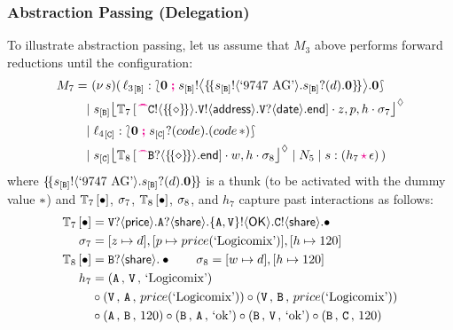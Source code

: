 \documentclass[runningheads,plain]{llncs}
\begin{document}
\subsubsection{Abstraction Passing (Delegation)}
To illustrate abstraction passing, let us assume that 
$M_3$ above performs forward reductions
until the configuration:
\begin{align*}
M_7 = ~ &   \news{s}(\,  \np{\key{{\loc_3}}{\pB}}{ \conf{\inact}{\bbout{\epB}{\thunkp{\bout{\epB}{\text{`9747 AG'}}\binp{\epB}{d}\inact}}\inact}} 
\\
& \!\!\!\! \Par \hmoni{\ep{s}{\pB}}{\myctxr{\ctx{T}_7}{\past \ltout{C}{\thunkt}{\ltout{\pS}{\mathsf{address}}{\ltinp{\pS}{\mathsf{date}}{\lend}}}}}{z,p,h}{\store_7} 
\\
& \!\!\!\! \Par \np{\key{{\loc_4}}{\pC}}{ \conf{\inact}{\binp{\epC}{code}(\appl{code}{\dummyn})}} 
\\
&  \!\!\!\! \Par 
\hmoni{\ep{s}{\pC}}{\myctxr{\ctx{T}_8}{\past \ltinp{B}{\thunkt}{\lend}}}{w,h}{\store_8} 
\Par N_5 \Par \codah{s}{h_7}{\emp}{}~) 
\end{align*}
where 
$\{\!\{s_{[\mathtt{B}]} ! \langle \text{`9747 AG'} \rangle .s_{[\mathtt{B}]} ? (d) .\mathbf{0}\}\!\}$
is a thunk (to be activated with the dummy value $\ast$) and 
${\mathbb{T}_7\left[\textcolor{black}{\bullet}\right]}$, $\sigma_7$, ${\mathbb{T}_8\left[\textcolor{black}{\bullet}\right]}$, $\sigma_8$,
and $h_7$ capture past interactions as follows:
\begin{align*}
{\mathbb{T}_7\left[\textcolor{black}{\bullet}\right]} & =
\mathtt{\mathtt{V}}?\langle\mathsf{price}\rangle.\mathtt{A}?\langle\mathsf{share}\rangle.\mathtt{\{A,\mathtt{V}\}}!\langle\mathsf{OK}\rangle.
\mathtt{C}!\langle\mathsf{share}\rangle.\bullet
\\
\sigma_7 & = [z\mapsto d],[p\mapsto price(\text{`Logicomix'})],[h\mapsto 120]
\\
{\mathbb{T}_8\left[\textcolor{black}{\bullet}\right]} & =\mathtt{B}?\langle\mathsf{share}\rangle.\bullet \qquad \sigma_8  = [w\mapsto d],[h\mapsto 120]
\\
h_7 & = 
(\mathtt{A} \,,\, \mathtt{V} \,,\,\text{`Logicomix'})
\\
& \circ
(\mathtt{V} \,,\, \mathtt{A} \,,\,price(\text{`Logicomix'}))
\circ
(\mathtt{V} \,,\, \mathtt{B} \,,\,price(\text{`Logicomix'}))
\\
& \circ
(\mathtt{A} \,,\, \mathtt{B} \,,\,120)
\circ
(\mathtt{B} \,,\, \mathtt{A} \,,\,\text{`ok'})
\circ
(\mathtt{B} \,,\, \mathtt{V} \,,\,\text{`ok'})
\circ
(\mathtt{B} \,,\, \mathtt{C} \,,\,120)
\end{align*}
\end{document}
